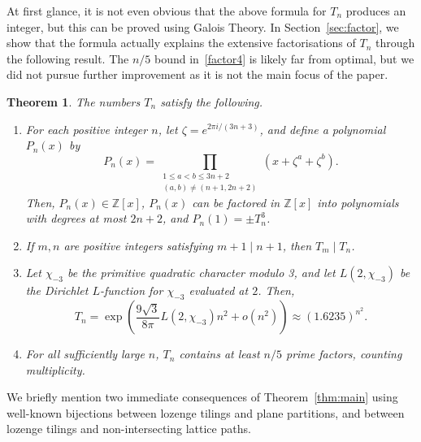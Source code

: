 \documentclass{article}
\newtheorem{theorem}{Theorem}[section]
\begin{document}
At first glance, it is not even obvious that the above formula for $T_n$ produces an integer, but this can be proved using Galois Theory. In Section~\ref{sec:factor}, we show that the formula actually explains the extensive factorisations of $T_n$ through the following result. The $n/5$ bound in~\ref{factor4} is likely far from optimal, but we did not pursue further improvement as it is not the main focus of the paper.
\begin{theorem}\label{thm:factor}
The numbers $T_n$ satisfy the following. 
\begin{enumerate}[label=\textup{\alph*)}]
    \item\label{factor1} For each positive integer $n$, let $\zeta=e^{2\pi i/(3n+3)}$, and define a polynomial $P_n(x)$ by 
    \[P_n(x)=\prod_{\substack{1\leq a<b\leq 3n+2\\(a,b)\not=(n+1,2n+2)}}(x+\zeta^a+\zeta^b).\]
    Then, $P_n(x)\in\mathbb{Z}[x]$, $P_n(x)$ can be factored in $\mathbb{Z}[x]$ into polynomials with degrees at most $2n+2$, and $P_n(1)=\pm T_n^3$.
    \item\label{factor2} If $m,n$ are positive integers satisfying $m+1\mid n+1$, then $T_m\mid T_n$.
    \item\label{factor3} Let $\chi_{-3}$ be the primitive quadratic character modulo 3, and let $L(2,\chi_{-3})$ be the Dirichlet $L$-function for $\chi_{-3}$ evaluated at $2$. Then, \[T_n=\exp\left(\frac{9\sqrt 3}{8\pi}L(2,\chi_{-3})n^2+o(n^2)\right)\approx(1.6235)^{n^2}.\]
    \item\label{factor4} For all sufficiently large $n$, $T_n$ contains at least $n/5$ prime factors, counting multiplicity.
\end{enumerate}
\end{theorem}

We briefly mention two immediate consequences of Theorem~\ref{thm:main} using well-known bijections between lozenge tilings and plane partitions, and between lozenge tilings and non-intersecting lattice paths. 
\end{document}
